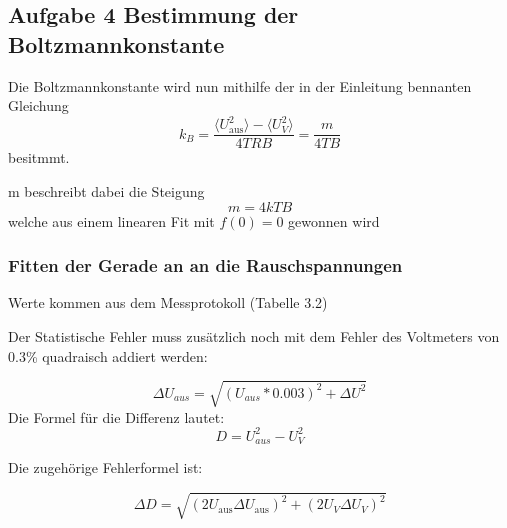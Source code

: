     \hypertarget{aufgabe-4-bestimmung-der-boltzmannkonstante}{%
\subsection{Aufgabe 4 Bestimmung der
Boltzmannkonstante}\label{aufgabe-4-bestimmung-der-boltzmannkonstante}}

Die Boltzmannkonstante wird nun mithilfe der in der Einleitung bennanten
Gleichung
\[k_B = \frac{\langle U_{\text{aus}}^2 \rangle - \langle U_V^2 \rangle}{4 T R B} = \frac{m}{4 T B}\]
besitmmt.

m beschreibt dabei die Steigung \[ m= 4kTB \] welche aus einem linearen
Fit mit \(f(0) = 0\) gewonnen wird

    \hypertarget{fitten-der-gerade-an-an-die-rauschspannungen}{%
\subsubsection{Fitten der Gerade an an die
Rauschspannungen}\label{fitten-der-gerade-an-an-die-rauschspannungen}}

Werte kommen aus dem Messprotokoll (Tabelle 3.2)

Der Statistische Fehler muss zusätzlich noch mit dem Fehler des
Voltmeters von 0.3\% quadraisch addiert werden:

\[\Delta U_{aus} = \sqrt{(U_{aus}*0.003)^2 + \Delta U^2}\] Die Formel
für die Differenz lautet: \[D = U_{aus}^2 - U_V^2  \]

Die zugehörige Fehlerformel ist:

\[\Delta D = \sqrt{(2U_{\text{aus}}\Delta U_{\text{aus}})^2 + (2U_V\Delta U_V)^2}\]

